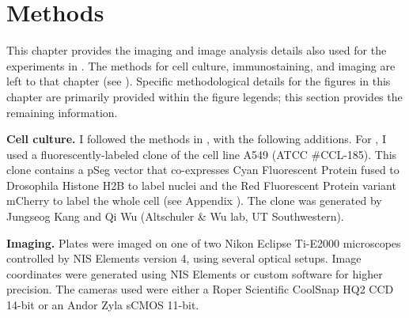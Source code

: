\section{Methods}
\label{imaging:methods}

This chapter provides the imaging and image analysis details
also
used for the experiments in .
The methods for cell culture, immunostaining,
and imaging are left to that chapter (see ).
Specific methodological details for the figures in
this chapter are primarily provided within the figure
legends; this section provides the remaining information.


\textbf{Cell culture.} I followed the methods in
, with the following additions.
For , I used a fluorescently-labeled
clone of the cell line A549 (ATCC \#CCL-185). This clone
contains a pSeg vector that co-expresses
Cyan Fluorescent Protein fused to
Drosophila Histone H2B to label nuclei and the
Red Fluorescent Protein variant mCherry to label the whole cell
(see Appendix ). The clone was generated by
Jungseog Kang and Qi Wu (Altschuler \& Wu lab, UT Southwestern).


\textbf{Imaging.} Plates were imaged on one
of two Nikon Eclipse Ti-E2000 microscopes controlled by NIS
Elements version 4, using several optical setups. Image coordinates
were generated using NIS Elements or custom software for higher
precision. The cameras used were either a Roper Scientific CoolSnap
HQ2 CCD 14-bit  or an Andor Zyla sCMOS 11-bit.

